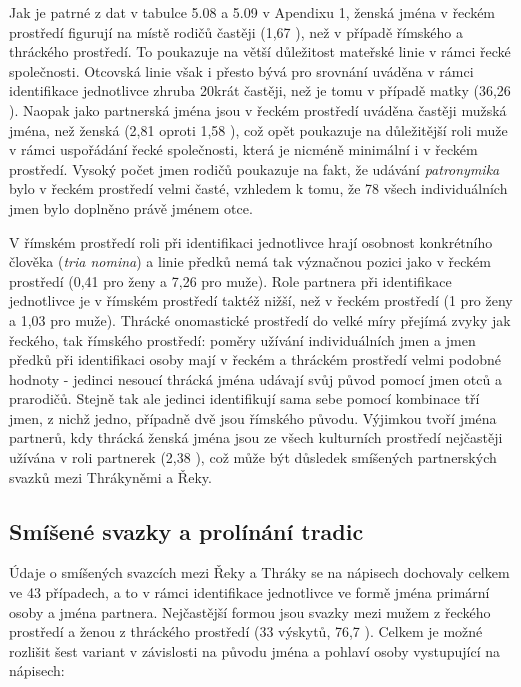 Jak je patrné z dat v tabulce 5.08 a 5.09 v Apendixu 1, ženská jména v řeckém prostředí figurují na místě rodičů častěji (1,67 ), než v případě římského a thráckého prostředí. To poukazuje na větší důležitost mateřské linie v rámci řecké společnosti. Otcovská linie však i přesto bývá pro srovnání uváděna v rámci identifikace jednotlivce zhruba 20krát častěji, než je tomu v případě matky (36,26 ). Naopak jako partnerská jména jsou v řeckém prostředí uváděna častěji mužská jména, než ženská (2,81  oproti 1,58 ), což opět poukazuje na důležitější roli muže v rámci uspořádání řecké společnosti, která je nicméně minimální i v řeckém prostředí. Vysoký počet jmen rodičů poukazuje na fakt, že udávání {\em patronymika} bylo v řeckém prostředí velmi časté, vzhledem k tomu, že 78  všech individuálních jmen bylo doplněno právě jménem otce.

V římském prostředí roli při identifikaci jednotlivce hrají osobnost konkrétního člověka ({\em tria nomina}) a linie předků nemá tak význačnou pozici jako v řeckém prostředí (0,41  pro ženy a 7,26  pro muže). Role partnera při identifikace jednotlivce je v římském prostředí taktéž nižší, než v řeckém prostředí (1  pro ženy a 1,03  pro muže). Thrácké onomastické prostředí do velké míry přejímá zvyky jak řeckého, tak římského prostředí: poměry užívání individuálních jmen a jmen předků při identifikaci osoby mají v řeckém a thráckém prostředí velmi podobné hodnoty - jedinci nesoucí thrácká jména udávají svůj původ pomocí jmen otců a prarodičů. Stejně tak ale jedinci identifikují sama sebe pomocí kombinace tří jmen, z nichž jedno, případně dvě jsou římského původu. Výjimkou tvoří jména partnerů, kdy thrácká ženská jména jsou ze všech kulturních prostředí nejčastěji užívána v roli partnerek (2,38 ), což může být důsledek smíšených partnerských svazků mezi Thrákyněmi a Řeky.

\subsection[smíšené-svazky-a-prolínání-tradic]{Smíšené svazky a prolínání tradic}

Údaje o smíšených svazcích mezi Řeky a Thráky se na nápisech dochovaly celkem ve 43 případech, a to v rámci identifikace jednotlivce ve formě jména primární osoby a jména partnera. Nejčastější formou jsou svazky mezi mužem z řeckého prostředí a ženou z thráckého prostředí (33 výskytů, 76,7 ). Celkem je možné rozlišit šest variant v závislosti na původu jména a pohlaví osoby vystupující na nápisech:

